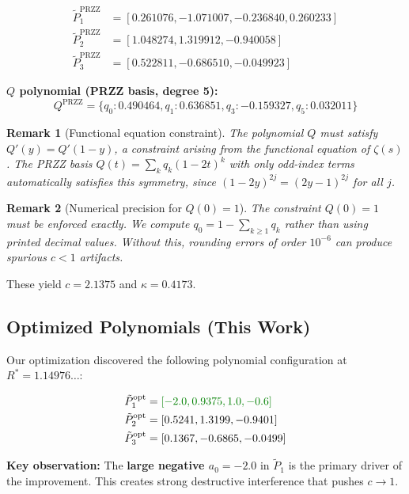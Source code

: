 \documentclass[11pt]{article}
\newtheorem{remark}{Remark}
\begin{document}
\begin{align}
\tilde{P}_1^{\text{PRZZ}} &= [0.261076, -1.071007, -0.236840, 0.260233] \\
\tilde{P}_2^{\text{PRZZ}} &= [1.048274, 1.319912, -0.940058] \\
\tilde{P}_3^{\text{PRZZ}} &= [0.522811, -0.686510, -0.049923]
\end{align}

\textbf{$Q$ polynomial (PRZZ basis, degree 5):}
\begin{equation}
Q^{\text{PRZZ}} = \{q_0: 0.490464, q_1: 0.636851, q_3: -0.159327, q_5: 0.032011\}
\end{equation}

\begin{remark}[Functional equation constraint]
The polynomial $Q$ must satisfy $Q'(y) = Q'(1-y)$, a constraint arising from
the functional equation of $\zeta(s)$ \cite{Conrey1989,Farmer2025}. The PRZZ basis
$Q(t) = \sum_k q_k (1-2t)^k$ with only odd-index terms automatically satisfies
this symmetry, since $(1-2y)^{2j} = (2y-1)^{2j}$ for all $j$.
\end{remark}

\begin{remark}[Numerical precision for $Q(0) = 1$]
\label{rem:Q-precision}
The constraint $Q(0) = 1$ must be enforced exactly. We compute $q_0 = 1 - \sum_{k \geq 1} q_k$ rather than using printed decimal values. Without this, rounding errors of order $10^{-6}$ can produce spurious $c < 1$ artifacts.
\end{remark}

These yield $c = 2.1375$ and $\kappa = 0.4173$.

\subsection{Optimized Polynomials (This Work)}

Our optimization discovered the following polynomial configuration at $R^* = 1.14976\ldots$:

\begin{align}
\tilde{P}_1^{\text{opt}} &= \textcolor{improvement}{[-2.0, 0.9375, 1.0, -0.6]} \\
\tilde{P}_2^{\text{opt}} &= [0.5241, 1.3199, -0.9401] \\
\tilde{P}_3^{\text{opt}} &= [0.1367, -0.6865, -0.0499]
\end{align}

\textbf{Key observation:} The \textcolor{improvement}{\textbf{large negative $a_0 = -2.0$}} in $\tilde{P}_1$ is the primary driver of the improvement. This creates strong destructive interference that pushes $c \to 1$.
\end{document}
